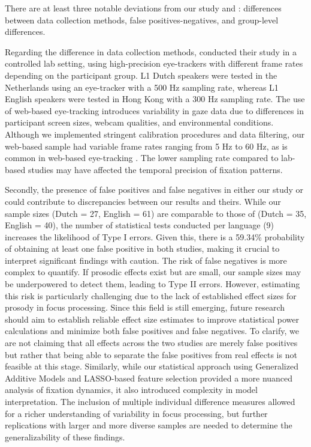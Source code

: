 There are at least three notable deviations from our study and \cite{ge2021a}: differences between data collection methods, false positives-negatives, and group-level differences. 

Regarding the difference in data collection methods, \cite{ge2021a} conducted their study in a controlled lab setting, using high-precision eye-trackers with different frame rates depending on the participant group. L1 Dutch speakers were tested in the Netherlands using an eye-tracker with a 500 Hz sampling rate, whereas L1 English speakers were tested in Hong Kong with a 300 Hz sampling rate. The use of web-based eye-tracking introduces variability in gaze data due to differences in participant screen sizes, webcam qualities, and environmental conditions. Although we implemented stringent calibration procedures and data filtering, our web-based sample had variable frame rates ranging from 5 Hz to 60 Hz, as is common in web-based eye-tracking \parencite{Vos_2022,AOW}. The lower sampling rate compared to lab-based studies may have affected the temporal precision of fixation patterns.

Secondly, the presence of false positives and false negatives in either our study or \cite{ge2021a} could contribute to discrepancies between our results and theirs. While our sample sizes (Dutch = 27, English = 61) are comparable to those of \cite{ge2021a} (Dutch = 35, English = 40), the number of statistical tests conducted per language (9) increases the likelihood of Type I errors. Given this, there is a 59.34\% probability of obtaining at least one false positive in both studies, making it crucial to interpret significant findings with caution. The risk of false negatives is more complex to quantify. If prosodic effects exist but are small, our sample sizes may be underpowered to detect them, leading to Type II errors. However, estimating this risk is particularly challenging due to the lack of established effect sizes for prosody in focus processing. Since this field is still emerging, future research should aim to establish reliable effect size estimates to improve statistical power calculations and minimize both false positives and false negatives. To clarify, we are not claiming that all effects across the two studies are merely false positives but rather that being able to separate the false positives from real effects is not feasible at this stage. Similarly, while our statistical approach using Generalized Additive Models and LASSO-based feature selection provided a more nuanced analysis of fixation dynamics, it also introduced complexity in model interpretation. The inclusion of multiple individual difference measures allowed for a richer understanding of variability in focus processing, but further replications with larger and more diverse samples are needed to determine the generalizability of these findings.

